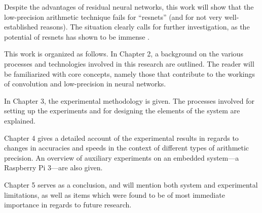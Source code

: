Despite the advantages of residual neural networks, this work will show that the low-precision arithmetic technique fails for ``resnets'' (and for not very well-established reasons). The situation clearly calls for further investigation, as the potential of resnets has shown to be immense \cite{resnets1}.

This work is organized as follows. In Chapter 2, a background on the various processes and technologies involved in this research are outlined. The reader will be familiarized with core concepts, namely those that contribute to the workings of convolution and low-precision in neural networks. 

In Chapter 3, the experimental methodology is given. The processes involved for setting up the experiments and for designing the elements of the system are explained.

Chapter 4 gives a detailed account of the experimental results in regards to changes in accuracies and speeds in the context of different types of arithmetic precision. An overview of auxiliary experiments on an embedded system---a Raspberry Pi 3---are also given.

Chapter 5 serves as a conclusion, and will mention both system and experimental limitations, as well as items which were found to be of most immediate importance in regards to future research.